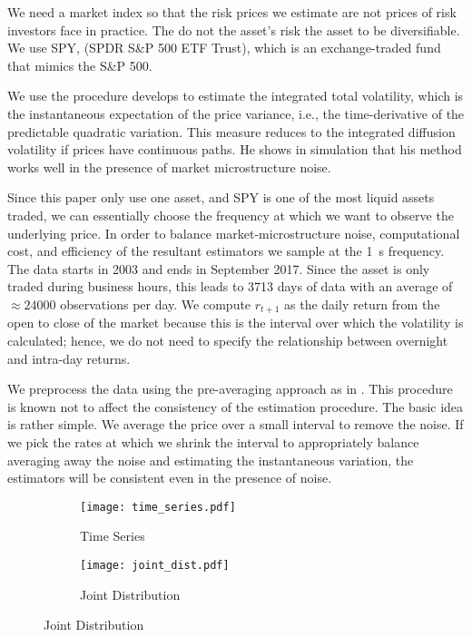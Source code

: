 \documentclass[11pt, letterpaper, twoside]{article}
\begin{document}
We need a market index so that the risk prices we estimate are not prices of risk investors face in practice. The do not the asset's risk the asset to be diversifiable. We use SPY, (SPDR S\&P 500 ETF Trust), which is an exchange-traded fund that mimics the S\&P 500.  

We use the procedure \textcite{sangrey2018jumps} develops to estimate the integrated total volatility, which is the instantaneous expectation of the price variance, i.e., the time-derivative of the predictable quadratic variation. This measure reduces to the integrated diffusion volatility if prices have continuous paths. He shows in simulation that his method works well in the presence of market microstructure noise.

Since this paper only use one asset, and SPY is one of the most liquid assets traded, we can essentially choose the frequency at which we want to observe the underlying price. In order to balance market-microstructure noise, computational cost, and efficiency of the resultant estimators we sample at the \SI{1}{\second} frequency. The data starts in 2003 and ends in September 2017. Since the asset is only traded during business hours, this leads to \num{3713} days of data with an average of $\approx \num{24000}$ observations per day.  We compute $r_{t+1}$ as the daily return from the open to close of the market because this is the interval over which the volatility is calculated; hence, we do not need to specify the relationship between overnight and intra-day returns.  

We preprocess the data using the pre-averaging approach as in \textcites{podolskij2009bipower, aitsahalia2012testing}. This procedure is known not to affect the consistency of the estimation procedure. The basic idea is rather simple. We average the price over a small interval to remove the noise. If we pick the rates at which we shrink the interval to appropriately balance averaging away the noise and estimating the instantaneous variation, the estimators will be consistent even in the presence of noise.  

\begin{figure}[htb]

    \centering
    \caption{S\&P 500 Volatility and Log-Return}


    \begin{subfigure}[t]{.54\textwidth}
        \label{fig:spy_dynamics}
        \caption{Time Series}
        \texttt{[image: time\_series.pdf]}
    \end{subfigure}%
%
    \hfill
%
    \begin{subfigure}[t]{.44\textwidth}
        \label{fig:spy_static}
        \caption{Joint Distribution}
        \texttt{[image: joint\_dist.pdf]}
    \end{subfigure}
\end{figure}
\end{document}
